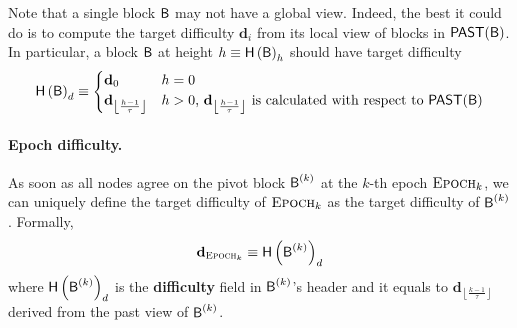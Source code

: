 Note that a single block $\textsf{B}$ may not have a global view.
Indeed, the best it could do is to compute the target difficulty $\mathbf{d}_i$ from its local view of blocks in $\mathsf{PAST}(\textsf{B})$.
In particular, a block $\textsf{B}$ at height $h\equiv \textsf{H}\left(\textsf{B}\right)_h$ should have target difficulty
\begin{align}
	\textsf{H}\left(\textsf{B}\right)_d\equiv \begin{cases}
		\mathbf{d}_0 & h= 0\\
		\mathbf{d}_{\left\lfloor \frac{ h-1}{\tau} \right\rfloor} & \mbox{$h>0$, $\mathbf{d}_{\left\lfloor \frac{ h-1}{\tau} \right\rfloor}$ is  calculated with respect to $\mathsf{PAST}(\textsf{B})$}
	\end{cases} 
\end{align}

\paragraph{Epoch difficulty.}
As soon as all nodes agree on the pivot block $\textsf{B}^{(k)}$ at the $k$-th epoch $\textsc{Epoch}_k$,
we can uniquely define the target difficulty of $\textsc{Epoch}_k$ as the target difficulty of $\textsf{B}^{(k)}$.
Formally, 
\begin{align}
	\mathbf{d}_{\textsc{Epoch}_k}\equiv \textsf{H}\left( \textsf{B}^{(k)} \right)_d
\end{align}
where $ \textsf{H}\left( \textsf{B}^{(k)} \right)_d$ is the {\bf difficulty} field in $\textsf{B}^{(k)}$'s header and it equals to $\mathbf{d}_{\left\lfloor \frac{k-1}{\tau} \right\rfloor}$ derived from the past view of $\textsf{B}^{(k)}$.












